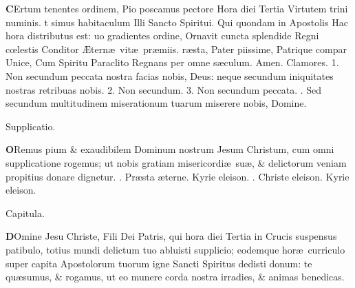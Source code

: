 \documentclass[letter,11pt]{book}
\makeatletter
\DeclareRobustCommand{\Vbar}{\vers@resp{-0.1em}{V}}
\DeclareRobustCommand{\Rbar}{\vers@resp{0pt}{R}}
\newcommand{\vers@resp@sym}{\raisebox{0.2ex}{\rotatebox[origin=c]{-20}{$\m@th\rceil$}}}
\newcommand{\vers@resp}[2]{%
  {\ooalign{\hidewidth\kern#1\vers@resp@sym\hidewidth\cr#2\cr}}%
}%
\def\V{\color{Red} \Vbar . \color{black}}
\def\R{\color{Red} \Rbar . \color{black}}
\makeatother
\begin{document}
\begin{multicols*}{2}
\lettrine[lines=2]{\bfseries \color{Red} C}{}Ertum tenentes ordinem,
\newline Pio poscamus pectore
\newline \indent Hora diei Tertia
\newline \indent Virtutem trini numinis.
t simus habitaculum
\newline \indent Illi Sancto Spiritui.
\newline \indent Qui quondam in Apostolis
\newline \indent Hac hora distributus est:
uo gradientes ordine,
\newline \indent Ornavit cuncta splendide
\newline \indent Regni c\oe lestis Conditor
\newline \indent \AE tern\ae \ vit\ae \ pr\ae miis.
r\ae sta, Pater piissime,
\newline \indent Patrique compar Unice,
\newline \indent Cum Spiritu Paraclito
\newline \indent Regnans per omne s\ae culum. Amen.
\newline \color{Red} Clamores. 1. \color{black} Non secundum peccata nostra facias nobis, Deus: neque secundum iniquitates nostras retribuas nobis. \color{Red} 2. \color{black} Non secundum. \color{Red} 3. \color{black} Non secundum peccata. \V Sed secundum multitudinem miserationum tuarum miserere nobis, Domine.
\vspace{-.5em} \begin{center} \color{Red} Supplicatio. \end{center} \vspace{-.5em}
\lettrine[lines=2]{\bfseries \color{Red} O}{}Remus pium \& exaudibilem Dominum nostrum Jesum Christum, cum omni supplicatione rogemus; ut nobis gratiam misericordi\ae \ su\ae , \& delictorum veniam propitius donare dignetur. \R Pr\ae sta \ae terne. Kyrie eleison. \R Christe eleison. Kyrie eleison.
\vspace{-.5em} \begin{center} \color{Red} Capitula. \end{center} \vspace{-.5em}
\lettrine[lines=2]{\bfseries \color{Red} D}{}Omine Jesu Christe, Fili Dei Patris, qui hora diei Tertia in Crucis suspensus patibulo, totius mundi delictum tuo abluisti supplicio; eodemque hor\ae \ curriculo super capita Apostolorum tuorum igne Sancti Spiritus dedisti donum: te qu\ae sumus, \& rogamus, ut eo munere corda nostra irradies, \& animas benedicas.

\end{multicols*}
\end{document}
